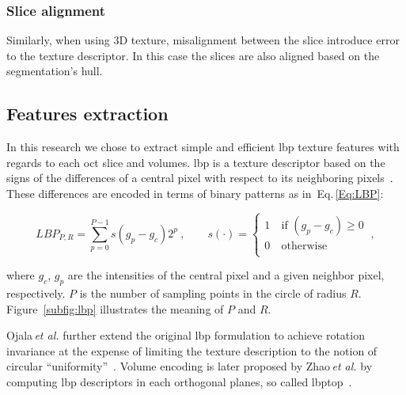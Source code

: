 \subsubsection{Slice alignment}
Similarly, when using 3D texture, misalignment between the slice introduce error to the texture descriptor. In this case the slices are also aligned based on the segmentation's hull.


\subsection{Features extraction}\label{subsec:feaext}
In this research we chose to extract simple and efficient \ac{lbp} texture features with regards to each \ac{oct} slice and volumes.
\ac{lbp} is a texture descriptor based on the signs of the differences of a central pixel with respect to its neighboring pixels~\cite{ojala2002multiresolution}.
These differences are encoded in terms of binary patterns as in~Eq.\,\eqref{Eq:LBP}:

\begin{equation}\label{Eq:LBP}
LBP_{P,R} = \sum_{p=0}^{P-1}s(g_{p} - g_{c})2^{p} \ , \qquad s(\cdot) = \begin{cases}
    1  & \ \text{if } (g_{p} - g_{c}) \geq 0\\
    0  & \ \text{otherwise}\\
  \end{cases} \ ,
\end{equation}

\noindent where $g_c$, $g_{p}$ are the intensities of the central pixel and a given neighbor pixel, respectively. $P$ is the number of sampling points in the circle of radius $R$. Figure~\ref{subfig:lbp} illustrates the meaning of $P$ and $R$.

Ojala\,\textit{et al.} further extend the original \ac{lbp} formulation to achieve rotation invariance at the expense of limiting the texture description to the notion of circular ``uniformity''~\cite{ojala2002multiresolution}.
Volume encoding is later proposed by Zhao\,\textit{et al.} by computing \ac{lbp} descriptors in each orthogonal planes, so called \ac{lbptop}~\cite{zhao2012rotation}.

